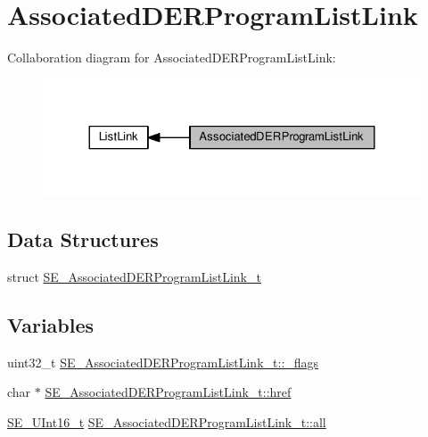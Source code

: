 \hypertarget{group__AssociatedDERProgramListLink}{}\section{Associated\+D\+E\+R\+Program\+List\+Link}
\label{group__AssociatedDERProgramListLink}
Collaboration diagram for Associated\+D\+E\+R\+Program\+List\+Link\+:\nopagebreak
\begin{figure}[H]
\begin{center}
\leavevmode
\includegraphics[width=324pt]{group__AssociatedDERProgramListLink}
\end{center}
\end{figure}
\subsection*{Data Structures}
\begin{DoxyCompactItemize}
\item 
struct \hyperlink{structSE__AssociatedDERProgramListLink__t}{S\+E\+\_\+\+Associated\+D\+E\+R\+Program\+List\+Link\+\_\+t}
\end{DoxyCompactItemize}
\subsection*{Variables}
\begin{DoxyCompactItemize}
\item 
uint32\+\_\+t \hyperlink{group__AssociatedDERProgramListLink_ga9b18cb252039dc6e31f30c98082c817f}{S\+E\+\_\+\+Associated\+D\+E\+R\+Program\+List\+Link\+\_\+t\+::\+\_\+flags}
\item 
char $\ast$ \hyperlink{group__AssociatedDERProgramListLink_ga0e6c12c3f2c05116497088b00af2e087}{S\+E\+\_\+\+Associated\+D\+E\+R\+Program\+List\+Link\+\_\+t\+::href}
\item 
\hyperlink{group__UInt16_gac68d541f189538bfd30cfaa712d20d29}{S\+E\+\_\+\+U\+Int16\+\_\+t} \hyperlink{group__AssociatedDERProgramListLink_gaa873f04f67391ceb7ce2c75b236c85d4}{S\+E\+\_\+\+Associated\+D\+E\+R\+Program\+List\+Link\+\_\+t\+::all}
\end{DoxyCompactItemize}


